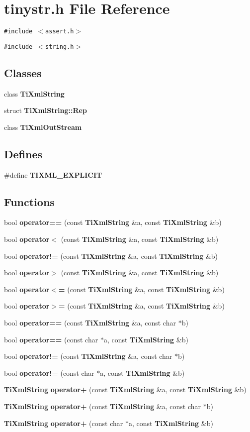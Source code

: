 \section{tinystr.h File Reference}
\label{tinystr_8h}


{\tt \#include $<$assert.h$>$}\par
{\tt \#include $<$string.h$>$}\par
\subsection*{Classes}
\begin{CompactItemize}
\item 
class {\bf TiXmlString}
\item 
struct \textbf{TiXmlString::Rep}
\item 
class {\bf TiXmlOutStream}
\end{CompactItemize}
\subsection*{Defines}
\begin{CompactItemize}
\item 
\#define {\bf TIXML\_\-EXPLICIT}
\end{CompactItemize}
\subsection*{Functions}
\begin{CompactItemize}
\item 
bool {\bf operator==} (const {\bf TiXmlString} \&a, const {\bf TiXmlString} \&b)
\item 
bool {\bf operator$<$} (const {\bf TiXmlString} \&a, const {\bf TiXmlString} \&b)
\item 
bool {\bf operator!=} (const {\bf TiXmlString} \&a, const {\bf TiXmlString} \&b)
\item 
bool {\bf operator$>$} (const {\bf TiXmlString} \&a, const {\bf TiXmlString} \&b)
\item 
bool {\bf operator$<$=} (const {\bf TiXmlString} \&a, const {\bf TiXmlString} \&b)
\item 
bool {\bf operator$>$=} (const {\bf TiXmlString} \&a, const {\bf TiXmlString} \&b)
\item 
bool {\bf operator==} (const {\bf TiXmlString} \&a, const char $\ast$b)
\item 
bool {\bf operator==} (const char $\ast$a, const {\bf TiXmlString} \&b)
\item 
bool {\bf operator!=} (const {\bf TiXmlString} \&a, const char $\ast$b)
\item 
bool {\bf operator!=} (const char $\ast$a, const {\bf TiXmlString} \&b)
\item 
{\bf TiXmlString} {\bf operator+} (const {\bf TiXmlString} \&a, const {\bf TiXmlString} \&b)
\item 
{\bf TiXmlString} {\bf operator+} (const {\bf TiXmlString} \&a, const char $\ast$b)
\item 
{\bf TiXmlString} {\bf operator+} (const char $\ast$a, const {\bf TiXmlString} \&b)
\end{CompactItemize}


